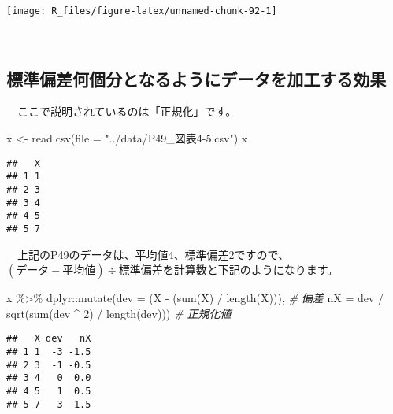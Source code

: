 \documentclass[
  12pt,
]{book}
\newenvironment{Shaded}{\begin{snugshade}}{\end{snugshade}}
\newcommand{\AttributeTok}[1]{\textcolor[rgb]{0.77,0.63,0.00}{#1}}
\newcommand{\CommentTok}[1]{\textcolor[rgb]{0.56,0.35,0.01}{\textit{#1}}}
\newcommand{\DecValTok}[1]{\textcolor[rgb]{0.00,0.00,0.81}{#1}}
\newcommand{\FunctionTok}[1]{\textcolor[rgb]{0.00,0.00,0.00}{#1}}
\newcommand{\NormalTok}[1]{#1}
\newcommand{\OtherTok}[1]{\textcolor[rgb]{0.56,0.35,0.01}{#1}}
\newcommand{\SpecialCharTok}[1]{\textcolor[rgb]{0.00,0.00,0.00}{#1}}
\newcommand{\StringTok}[1]{\textcolor[rgb]{0.31,0.60,0.02}{#1}}
\begin{document}
\begin{center}\texttt{[image: R\_files/figure-latex/unnamed-chunk-92-1]} \end{center}

　

\hypertarget{ux6a19ux6e96ux504fux5deeux4f55ux500bux5206ux3068ux306aux308bux3088ux3046ux306bux30c7ux30fcux30bfux3092ux52a0ux5de5ux3059ux308bux52b9ux679c}{%
\subsection{標準偏差何個分となるようにデータを加工する効果}\label{ux6a19ux6e96ux504fux5deeux4f55ux500bux5206ux3068ux306aux308bux3088ux3046ux306bux30c7ux30fcux30bfux3092ux52a0ux5de5ux3059ux308bux52b9ux679c}}

　ここで説明されているのは「正規化」です。

\begin{Shaded}
\begin{Highlighting}[]
\NormalTok{x }\OtherTok{\textless{}{-}} \FunctionTok{read.csv}\NormalTok{(}\AttributeTok{file =} \StringTok{"../data/P49\_図表4{-}5.csv"}\NormalTok{)}
\NormalTok{x}
\end{Highlighting}
\end{Shaded}

\begin{verbatim}
##   X
## 1 1
## 2 3
## 3 4
## 4 5
## 5 7
\end{verbatim}

　上記のP49のデータは、平均値\(4\)、標準偏差\(2\)ですので、\((データ - 平均値) \div 標準偏差\)を計算数と下記のようになります。

\begin{Shaded}
\begin{Highlighting}[]
\NormalTok{x }\SpecialCharTok{\%\textgreater{}\%} 
\NormalTok{  dplyr}\SpecialCharTok{::}\FunctionTok{mutate}\NormalTok{(}\AttributeTok{dev =}\NormalTok{ (X }\SpecialCharTok{{-}}\NormalTok{ (}\FunctionTok{sum}\NormalTok{(X) }\SpecialCharTok{/} \FunctionTok{length}\NormalTok{(X))),            }\CommentTok{\# 偏差}
                \AttributeTok{nX =}\NormalTok{ dev }\SpecialCharTok{/} \FunctionTok{sqrt}\NormalTok{(}\FunctionTok{sum}\NormalTok{(dev }\SpecialCharTok{\^{}} \DecValTok{2}\NormalTok{) }\SpecialCharTok{/} \FunctionTok{length}\NormalTok{(dev))) }\CommentTok{\# 正規化値}
\end{Highlighting}
\end{Shaded}

\begin{verbatim}
##   X dev   nX
## 1 1  -3 -1.5
## 2 3  -1 -0.5
## 3 4   0  0.0
## 4 5   1  0.5
## 5 7   3  1.5
\end{verbatim}
\end{document}
